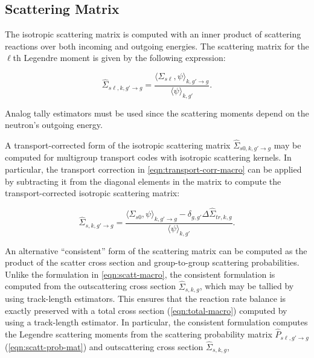 \subsection{Scattering Matrix}
\label{subsubsec:tally-types-scatt-mat}

The isotropic scattering matrix is computed with an inner product of scattering reactions over both incoming and outgoing energies. The scattering matrix for the $\ell$th Legendre moment is given by the following expression:



\begin{equation}
\label{eqn:scatt-macro}
\hat{\Sigma}_{s\ell,k,g'\rightarrow g} = \frac{\langle \Sigma_{s\ell}, \psi \rangle_{k,g'\rightarrow g}}{\langle \psi \rangle_{k,g'}}.
\end{equation}

\noindent Analog tally estimators must be used since the scattering moments depend on the neutron's outgoing energy.

A transport-corrected form of the isotropic scattering matrix $\hat{\Sigma}_{s0,k,g'\rightarrow g}$ may be computed for multigroup transport codes with isotropic scattering kernels. In particular, the transport correction in \cref{eqn:transport-corr-macro} can be applied by subtracting it from the diagonal elements in the matrix to compute the transport-corrected isotropic scattering matrix:

\begin{equation}
\label{eqn:scatt-trans-macro}
\hat{\Sigma}_{s,k,g'\rightarrow g} = \frac{\langle \Sigma_{s0}, \psi \rangle_{k,g'\rightarrow g} - \delta_{g,g'} \Delta\hat{\Sigma}_{tr,k,g}}{\langle \psi \rangle_{k,g'}}.
\end{equation}


An alternative ``consistent'' form of the scattering matrix can be computed as the product of the scatter cross section and group-to-group scattering probabilities. Unlike the formulation in \cref{eqn:scatt-macro}, the consistent formulation is computed from the outscattering cross section $\hat{\Sigma}_{s,k,g}$, which may be tallied by using track-length estimators. This ensures that the reaction rate balance is exactly preserved with a total cross section (\cref{eqn:total-macro}) computed by using a track-length estimator. In particular, the consistent formulation computes the Legendre scattering moments from the scattering probability matrix $\hat{P}_{s\ell,g'\rightarrow g}$ (\cref{eqn:scatt-prob-mat}) and outscattering cross section $\hat{\Sigma}_{s,k,g}$,

